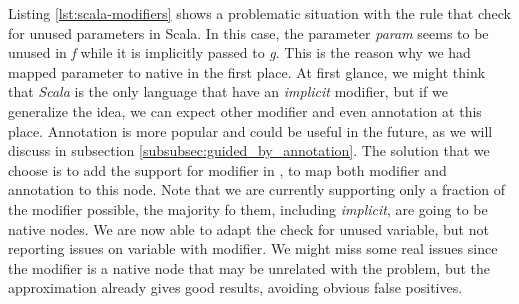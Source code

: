 \begin{enumerate}
	
	Listing \ref{lst:scala-modifiers} shows a problematic situation with the rule that check for unused parameters in Scala. In this case, the parameter \emph{param} seems to be unused in \emph{f} while it is implicitly passed to \emph{g}.
	This is the reason why we had mapped parameter to native in the first place.
	At first glance, we might think that \emph{Scala} is the only language that have an \emph{implicit} modifier, but if we generalize the idea, we can expect other modifier and even annotation at this place. 
	Annotation is more popular and could be useful in the future, as we will discuss in subsection \ref{subsubsec:guided_by_annotation}.
	The solution that we choose is to add the support for modifier in \slang{}, to map both modifier and annotation to this node.
	Note that we are currently supporting only a fraction of the modifier possible, the majority fo them, including \emph{implicit}, are going to be native nodes.
	We are now able to adapt the check for unused variable, but not reporting issues on variable with modifier. 
	We might miss some real issues since the modifier is a native node that may be unrelated with the problem, but the approximation already gives good results, avoiding obvious false positives.
\end{enumerate}

